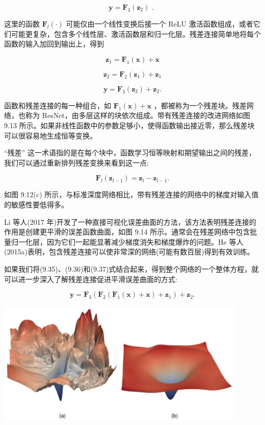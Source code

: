 \documentclass[10pt]{report}
\begin{document}
\[
\mathbf{y} = {\mathbf{F}}_{3}\left( {\mathbf{z}}_{2}\right) \text{ . } \tag{9.34}
\]

这里的函数 \({\mathbf{F}}_{l}\left( \cdot \right)\) 可能仅由一个线性变换后接一个 ReLU 激活函数组成，或者它们可能更复杂，包含多个线性层、激活函数层和归一化层。残差连接简单地将每个函数的输入加回到输出上，得到

\[
{\mathbf{z}}_{1} = {\mathbf{F}}_{1}\left( \mathbf{x}\right)  + \mathbf{x} \tag{9.35}
\]

\[
{\mathbf{z}}_{2} = {\mathbf{F}}_{2}\left( {\mathbf{z}}_{1}\right)  + {\mathbf{z}}_{1} \tag{9.36}
\]

\[
\mathbf{y} = {\mathbf{F}}_{3}\left( {\mathbf{z}}_{2}\right)  + {\mathbf{z}}_{2}. \tag{9.37}
\]

函数和残差连接的每一种组合，如 \({\mathbf{F}}_{1}\left( \mathbf{x}\right)  + \mathbf{x}\) ，都被称为一个残差块。残差网络，也称为 ResNet，由多层这样的块依次组成。带有残差连接的改进网络如图 9.13 所示。如果非线性函数中的参数足够小，使得函数输出接近零，那么残差块可以很容易地生成恒等变换。

“残差” 这一术语指的是在每个块中，函数学习恒等映射和期望输出之间的残差，我们可以通过重新排列残差变换来看到这一点:

\[
{\mathbf{F}}_{l}\left( {\mathbf{z}}_{l - 1}\right)  = {\mathbf{z}}_{l} - {\mathbf{z}}_{l - 1}. \tag{9.38}
\]

如图 9.12(c) 所示，与标准深度网络相比，带有残差连接的网络中的梯度对输入值的敏感性要低得多。

Li 等人(2017 年)开发了一种直接可视化误差曲面的方法，该方法表明残差连接的作用是创建更平滑的误差函数曲面，如图 9.14 所示。通常会在残差网络中包含批量归一化层，因为它们一起能显著减少梯度消失和梯度爆炸的问题。He 等人(2015a)表明，包含残差连接可以使非常深的网络(可能有数百层)得到有效训练。

如果我们将(9.35)、(9.36)和(9.37)式结合起来，得到整个网络的一个整体方程，就可以进一步深入了解残差连接促进平滑误差曲面的方式:

\[
\mathbf{y} = {\mathbf{F}}_{3}\left( {{\mathbf{F}}_{2}\left( {{\mathbf{F}}_{1}\left( \mathbf{x}\right)  + \mathbf{x}}\right)  + {\mathbf{z}}_{1}}\right)  + {\mathbf{z}}_{2}. \tag{9.39}
\]

\begin{center}
\includegraphics[max width=0.9\textwidth]{images/0194e279-9b28-703a-88f4-c3ac21e2010d_295_307_366_1199_595_0.jpg}
\end{center}
\hspace*{3em} 
\end{document}
